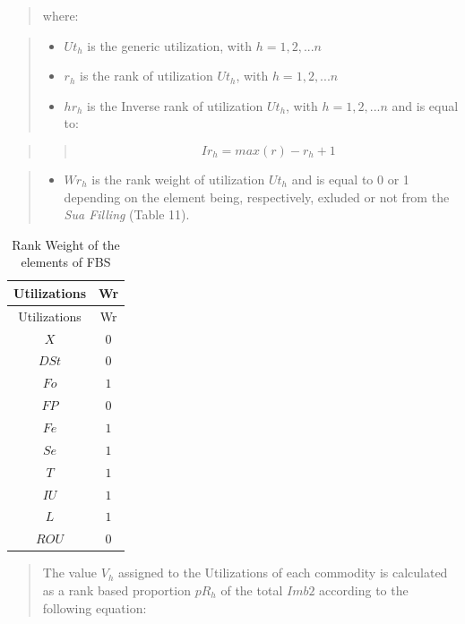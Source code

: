 \documentclass[]{article}
\providecommand{\tightlist}{%
  \setlength{\itemsep}{0pt}\setlength{\parskip}{0pt}}
\begin{document}
\begin{quote}
where:
\end{quote}

\begin{quote}
\begin{itemize}
\tightlist
\item
  \(Ut_{h}\) is the generic utilization, with \(h=1,2,...n\)
\item
  \(r_{h}\) is the rank of utilization \(Ut_{h}\), with \(h=1,2,...n\)
\item
  \(hr_{h}\) is the Inverse rank of utilization \(Ut_{h}\), with
  \(h=1,2,...n\) and is equal to:
\end{itemize}
\end{quote}

\begin{quote}
\begin{quote}
\begin{equation}
\label{eq:inverseRankequation}
Ir_{h} = max(r)-r_{h}+1
\end{equation}
\end{quote}
\end{quote}

\begin{quote}
\begin{itemize}
\tightlist
\item
  \(Wr_{h}\) is the rank weight of utilization \(Ut_{h}\) and is equal
  to 0 or 1 depending on the element being, respectively, exluded or not
  from the \emph{Sua Filling} (Table 11).
\end{itemize}
\end{quote}

\begin{longtable}[]{@{}cc@{}}
\caption{Rank Weight of the elements of FBS}\tabularnewline
\toprule
Utilizations & Wr\tabularnewline
\midrule
\endfirsthead
\toprule
Utilizations & Wr\tabularnewline
\midrule
\endhead
\(X\) & \(0\)\tabularnewline
\(DSt\) & \(0\)\tabularnewline
\(Fo\) & \(1\)\tabularnewline
\(FP\) & \(0\)\tabularnewline
\(Fe\) & \(1\)\tabularnewline
\(Se\) & \(1\)\tabularnewline
\(T\) & \(1\)\tabularnewline
\(IU\) & \(1\)\tabularnewline
\(L\) & \(1\)\tabularnewline
\(ROU\) & \(0\)\tabularnewline
\bottomrule
\end{longtable}

\begin{quote}
The value \(V_{h}\) assigned to the Utilizations of each commodity is
calculated as a rank based proportion \(pR_{h}\) of the total \(Imb2\)
according to the following equation:
\end{quote}
\end{document}
